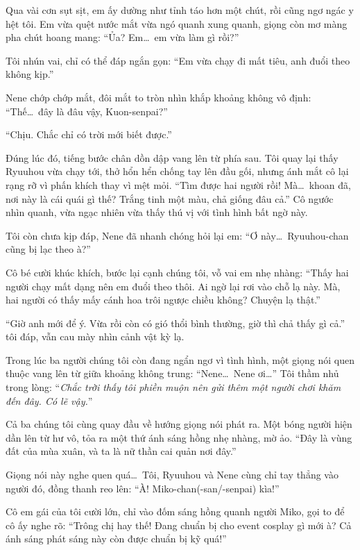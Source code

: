 \documentclass[../main.tex]{subfiles}
\begin{document}
Qua vài cơn sụt sịt, em ấy dường như tỉnh táo hơn một chút, rồi cũng ngơ ngác y hệt tôi. Em vừa quệt nước mắt vừa ngó quanh xung quanh, giọng còn mơ màng pha chút hoang mang: ``Ủa? Em\dots\ em vừa làm gì rồi?''

Tôi nhún vai, chỉ có thể đáp ngắn gọn: ``Em vừa chạy đi mất tiêu, anh đuổi theo không kịp.''

Nene chớp chớp mắt, đôi mắt to tròn nhìn khắp khoảng không vô định: ``Thế\dots\ đây là đâu vậy, Kuon-senpai?''

``Chịu. Chắc chỉ có trời mới biết được.''


Đúng lúc đó, tiếng bước chân dồn dập vang lên từ phía sau. Tôi quay lại thấy Ryuuhou vừa chạy tới, thở hổn hển chống tay lên đầu gối, nhưng ánh mắt cô lại rạng rỡ vì phấn khích thay vì mệt mỏi. ``Tìm được hai người rồi! Mà\dots\ khoan đã, nơi này là cái quái gì thế? Trắng tinh một màu, chả giống đâu cả.'' Cô ngước nhìn quanh, vừa ngạc nhiên vừa thấy thú vị với tình hình bất ngờ này.

Tôi còn chưa kịp đáp, Nene đã nhanh chóng hỏi lại em: ``Ơ này\dots\ Ryuuhou-chan cũng bị lạc theo à?''

Cô bé cười khúc khích, bước lại cạnh chúng tôi, vỗ vai em nhẹ nhàng: ``Thấy hai người chạy mất dạng nên em đuổi theo thôi. Ai ngờ lại rơi vào chỗ lạ này. Mà, hai người có thấy mấy cánh hoa trôi ngược chiều không? Chuyện lạ thật.''

``Giờ anh mới để ý. Vừa rồi còn có gió thổi bình thường, giờ thì chả thấy gì cả.'' tôi đáp, vẫn cau mày nhìn cảnh vật kỳ lạ.

Trong lúc ba người chúng tôi còn đang ngẩn ngơ vì tình hình, một giọng nói quen thuộc vang lên từ giữa khoảng không trung: ``Nene\dots\ Nene ơi\dots'' Tôi thầm nhủ trong lòng: ``\textit{Chắc trời thấy tôi phiền muộn nên gửi thêm một người chơi khăm đến đây. Có lẽ vậy.}''

Cả ba chúng tôi cùng quay đầu về hướng giọng nói phát ra. Một bóng người hiện dần lên từ hư vô, tỏa ra một thứ ánh sáng hồng nhẹ nhàng, mờ ảo. ``Đây là vùng đất của mùa xuân, và ta là nữ thần cai quản nơi đây.''

Giọng nói này nghe quen quá\dots\ Tôi, Ryuuhou và Nene cùng chỉ tay thẳng vào người đó, đồng thanh reo lên: ``À! Miko-chan(-san/-senpai) kìa!''

Cô em gái của tôi cười lớn, chỉ vào đốm sáng hồng quanh người Miko, gọi to để cô ấy nghe rõ: ``Trông chị hay thế! Đang chuẩn bị cho event cosplay gì mới à? Cả ánh sáng phát sáng này còn được chuẩn bị kỹ quá!''
\end{document}
